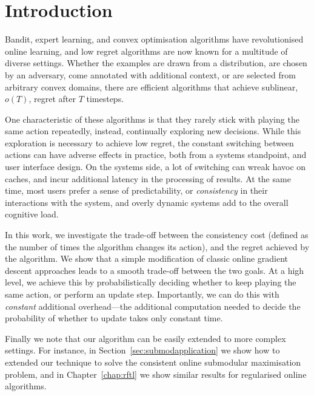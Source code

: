 \chapter{Introduction}
Bandit, expert learning, and convex optimisation algorithms have revolutionised online learning, and low regret algorithms are now known for a multitude of diverse settings. Whether the examples are drawn from a distribution, are chosen by an adversary,  come annotated with additional context, or are selected from arbitrary convex domains, there are efficient algorithms that achieve sublinear, $o(T)$, regret after $T$ timesteps. 

One characteristic of these algorithms is that they rarely stick with playing the same action repeatedly, instead, continually exploring new decisions. While this exploration is necessary to achieve low regret, the constant switching between actions can have adverse effects in practice, both from a systems standpoint, and user interface design.  On the systems side,  a lot of switching can wreak havoc on caches, and incur additional latency in the processing of results.  At the same time, most users prefer a sense of predictability, or {\em consistency} in their interactions with the system, and overly dynamic systems add to the overall cognitive load.  

In this work, we investigate the trade-off between the consistency cost (defined as the number of times the algorithm changes its action), and the regret achieved by the algorithm. We show that a simple modification of classic online gradient descent approaches leads to a smooth trade-off between the two goals. At a high level, we achieve this by probabilistically deciding whether to keep playing the same action, or perform an update step. Importantly, we can do this with \emph{constant} additional overhead---the additional computation needed to decide the probability of whether to update takes only constant time. 

Finally we note that our algorithm can be easily extended to more complex settings. For instance, in Section~\ref{sec:submodapplication} we show how to extended our technique to solve the consistent online submodular maximisation problem, and in Chapter~\ref{chap:rftl} we show similar results for regularised online algorithms.

